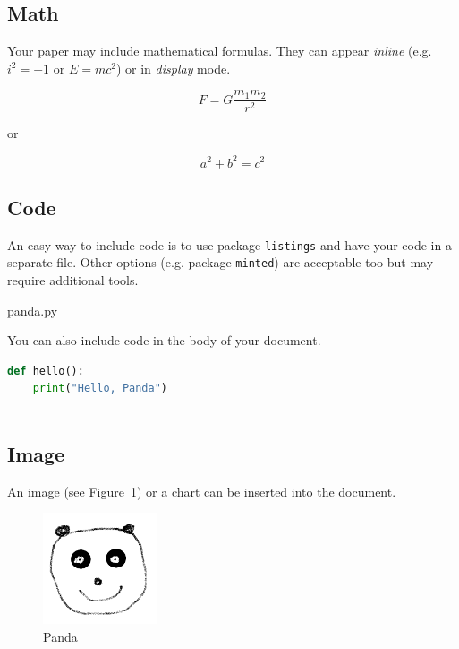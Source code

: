\documentclass[nonacm]{acmart}
\begin{document}
\subsection{Math}

Your paper may include mathematical formulas. They can appear \emph{inline}
(e.g. \begin{math}i^2=-1\end{math} or \(E=mc^2\)) or in \emph{display} mode.

\begin{equation}
    F = G \frac{m_1 m_2}{r^2}
\end{equation}

or

\[a^2 + b^2 = c^2\]

\subsection{Code}

An easy way to include code is to use package \texttt{listings} and have your
code in a separate file. Other options (e.g. package \texttt{minted}) are
acceptable too but may require additional tools.


                 {panda.py}

\noindent You can also include code in the body of your document.

\begin{lstlisting}[language=Python, caption=\texttt{hello} inline and with different options, captionpos=b, frame=trbl, showstringspaces=false]
def hello():
    print("Hello, Panda")
    
\end{lstlisting}

\subsection{Image}

An image (see Figure~\ref{fig:panda}) or a chart can be inserted into the
document.

\begin{figure}[!htbp]
    \centering
    \includegraphics[width=0.3\textwidth]{panda.png}
    \caption{Panda}
    \label{fig:panda}
\end{figure}
\end{document}
